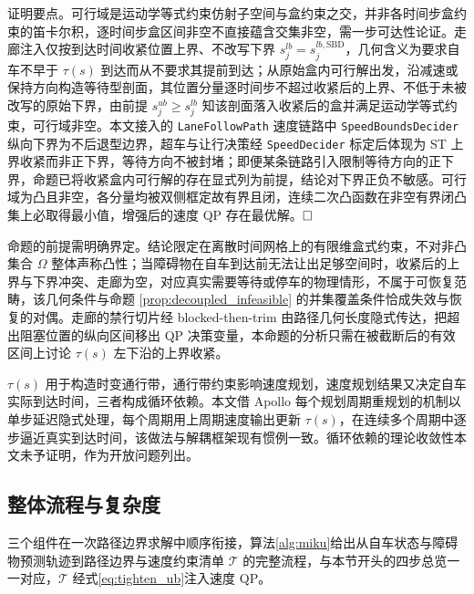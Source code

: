 \documentclass[a4paper,zihao=5]{ctexart}
\theoremstyle{definition}
\begin{document}
证明要点。可行域是运动学等式约束仿射子空间与盒约束之交，并非各时间步盒约束的笛卡尔积，逐时间步盒区间非空不直接蕴含交集非空，需一步可达性论证。走廊注入仅按到达时间收紧位置上界、不改写下界 $s_j^{lb}=s_j^{lb,\mathrm{SBD}}$，几何含义为要求自车不早于 $\tau(s)$ 到达而从不要求其提前到达；从原始盒内可行解出发，沿减速或保持方向构造等待型剖面，其位置分量逐时间步不超过收紧后的上界、不低于未被改写的原始下界，由前提 $s_j^{ub} \geq s_j^{lb}$ 知该剖面落入收紧后的盒并满足运动学等式约束，可行域非空。本文接入的 \texttt{LaneFollowPath} 速度链路中 \texttt{SpeedBoundsDecider} 纵向下界为不后退型边界，超车与让行决策经 \texttt{SpeedDecider} 标定后体现为 ST 上界收紧而非正下界，等待方向不被封堵；即便某条链路引入限制等待方向的正下界，命题已将收紧盒内可行解的存在显式列为前提，结论对下界正负不敏感。可行域为凸且非空，各分量均被双侧框定故有界且闭，连续二次凸函数在非空有界闭凸集上必取得最小值，增强后的速度 QP 存在最优解。$\hfill\Box$

命题的前提需明确界定。结论限定在离散时间网格上的有限维盒式约束，不对非凸集合 $\Omega$ 整体声称凸性；当障碍物在自车到达前无法让出足够空间时，收紧后的上界与下界冲突、走廊为空，对应真实需要等待或停车的物理情形，不属于可恢复范畴，该几何条件与命题 \ref{prop:decoupled_infeasible} 的并集覆盖条件恰成失效与恢复的对偶。走廊的禁行切片经 blocked-then-trim 由路径几何长度隐式传达，把超出阻塞位置的纵向区间移出 QP 决策变量，本命题的分析只需在被截断后的有效区间上讨论 $\tau(s)$ 左下沿的上界收紧。

$\tau(s)$ 用于构造时变通行带，通行带约束影响速度规划，速度规划结果又决定自车实际到达时间，三者构成循环依赖。本文借 Apollo 每个规划周期重规划的机制以单步延迟隐式处理，每个周期用上周期速度输出更新 $\tau(s)$，在连续多个周期中逐步逼近真实到达时间，该做法与解耦框架现有惯例一致。循环依赖的理论收敛性本文未予证明，作为开放问题列出。

\subsection{整体流程与复杂度}
\label{sec:method_algorithm}

三个组件在一次路径边界求解中顺序衔接，算法\ref{alg:miku}给出从自车状态与障碍物预测轨迹到路径边界与速度约束清单 $\mathcal{T}$ 的完整流程，与本节开头的四步总览一一对应，$\mathcal{T}$ 经式\eqref{eq:tighten_ub}注入速度 QP。
\end{document}
